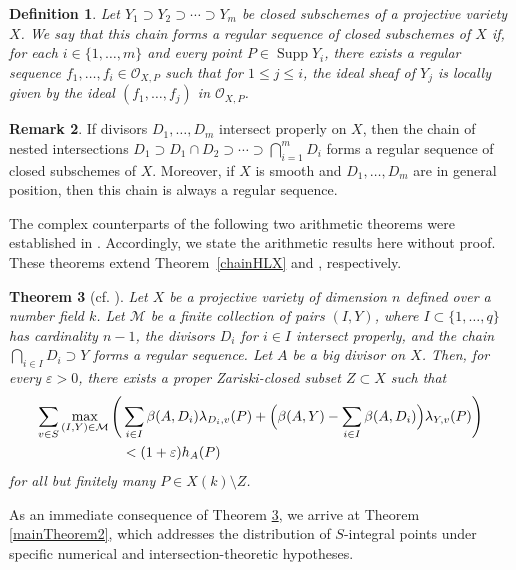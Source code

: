 \documentclass[10pt]{amsart}
\numberwithin{equation}{section}
\theoremstyle{plain}
\newtheorem{theorem}{Theorem}[section]
\newtheorem{definition}[theorem]{Definition}
\theoremstyle{definition}
\newtheorem{remark}[theorem]{Remark}
\DeclareMathOperator{\Supp}{Supp}
\begin{document}
 \begin{definition}\label{regular chain}
Let $Y_1\supset Y_2\supset \cdots\supset Y_m$ be closed subschemes of a projective variety $X$. We say that this chain forms  a {\it regular sequence of closed subschemes of $X$} if, for each $i\in \{1,\ldots, m\}$ and every point $P\in \Supp Y_i$, there exists a regular sequence $f_1,\ldots, f_i\in \mathcal{O}_{X,P}$ such that for $1\leq j\leq i$, the ideal sheaf of $Y_j$ is locally given by the ideal $(f_1,\ldots, f_j)$ in $\mathcal{O}_{X,P}$.
\end{definition}
\begin{remark}
    If divisors $D_1,\ldots, D_m$ intersect properly on $X$, then the chain of nested intersections $D_1\supset D_1\cap D_2\supset\cdots\supset \bigcap_{i=1}^m D_i$ forms a regular sequence of closed subschemes of $X$. Moreover, if $X$   is smooth and  $D_1,\ldots,D_m$ are in general position, then this chain is always a regular sequence.
    \end{remark}

 

The complex counterparts of the following two arithmetic theorems were established in \cite{WX2025}. Accordingly, we state the arithmetic results here without proof. These theorems extend Theorem~\ref{chainHLX} and \cite[Theorem 5.9]{HLX}, respectively.

\begin{theorem}[cf. {\cite[Theorems 1.8]{WX2025}}]\label{trungeneral}
   Let $X$ be a projective variety of dimension $n$ defined over a number field $k$.  Let $\mathcal M$ be a finite collection of  pairs $ (I,Y) $, where $I\subset\{1,\hdots,q\}$ has cardinality $n-1$, the divisors $D_i$ for $i \in I$ intersect properly, and the chain $\bigcap_{i \in I} D_i \supset Y$ forms a regular sequence.
Let $A$ be a big divisor on $X$.  
 Then, for every $\varepsilon>0$,  there exists a proper  Zariski-closed subset $Z\subset X$ such that 
  \begin{align}\label{mainineq}
\sum_{v\in S} \max_{(I,Y) \in \mathcal{M}}\Bigg(
&\sum_{i \in I}  \beta(A, D_{i})\lambda_{D_{i},v}(P)  
 + \Big( \beta(A, Y ) - \sum_{i \in I} \beta(A, D_i) \Big) \lambda_{Y,v }(P)
\Bigg)  \notag\\
&<(1+\varepsilon) h_{A}(P) 
\end{align}
 for all but finitely many $P\in X(k)\setminus Z$.
\end{theorem}

As an immediate consequence of Theorem \ref{trungeneral}, we arrive at Theorem \ref{mainTheorem2}, which addresses the distribution of $S$-integral points under specific numerical and intersection-theoretic hypotheses. 
\end{document}
